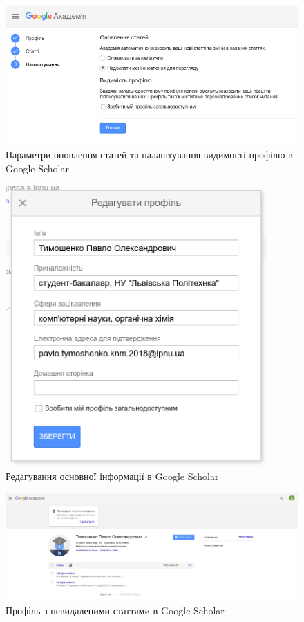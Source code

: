 \documentclass[oneside,14pt,a4paper]{extreport}
\begin{document}
\begin{figure}[H]
    \centering
    \includegraphics[width=15cm]{imgs/scholar_profile_settings.png}
    \caption{Параметри оновлення статей та налаштування видимості профілю в Google Scholar}
    \label{pic:scholar-profile-settings}
\end{figure}

\begin{figure}[H]
    \centering
    \includegraphics[width=10cm]{imgs/scholar_profile_filling.png}
    \caption{Редагування основної інформації в Google Scholar}
    \label{pic:scholar-profile-filling}
\end{figure}

\begin{figure}[H]
    \centering
    \includegraphics[width=15cm]{imgs/scholar_profile.png}
    \caption{Профіль з невидаленими статтями в Google Scholar}
    \label{pic:scholar-profile}
\end{figure}
\end{document}
